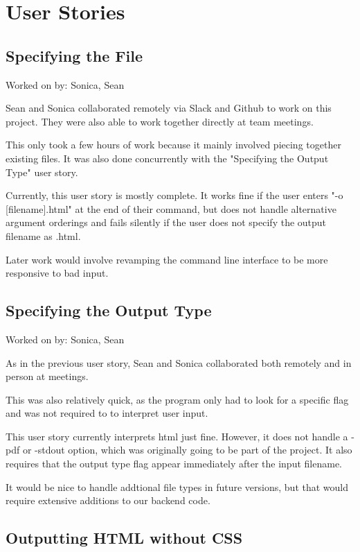 \section{User Stories}

\subsection{Specifying the File}

Worked on by: Sonica, Sean

Sean and Sonica collaborated remotely via Slack and Github to work on this project. They were also able to work together directly at team meetings.

This only took a few hours of work because it mainly involved piecing together existing files. It was also done concurrently with the "Specifying the Output Type" user story.

Currently, this user story is mostly complete. It works fine if the user enters "-o [filename].html" at the end of their command, but does not handle alternative argument orderings and fails silently if the user does not specify the output filename as .html.

Later work would involve revamping the command line interface to be more responsive to bad input.

\subsection{Specifying the Output Type}

Worked on by: Sonica, Sean

As in the previous user story, Sean and Sonica collaborated both remotely and in person at meetings.

This was also relatively quick, as the program only had to look for a specific flag and was not required to to interpret user input.

This user story currently interprets html just fine. However, it does not handle a -pdf or -stdout option, which was originally going to be part of the project. It also requires that the output type flag appear immediately after the input filename.

It would be nice to handle addtional file types in future versions, but that would require extensive additions to our backend code.



\subsection{Outputting HTML without CSS}
 \newline

